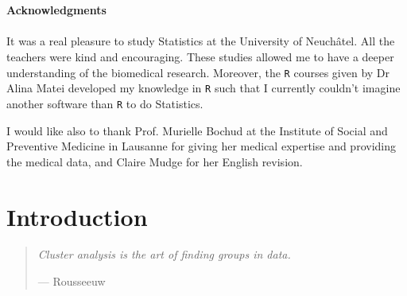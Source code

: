 \documentclass[a4paper]{book}
\author{Denis Deriaz}
\begin{document}





\chapter*{ }

{\LARGE \textbf{Acknowledgments}} \\
\\
It was a real pleasure to study Statistics at the University of Neuchâtel. All the teachers were kind and encouraging. These studies allowed me to have a deeper understanding of the biomedical research. Moreover, the \texttt{R} courses given by Dr Alina Matei developed my knowledge in \texttt{R} such that I currently couldn't imagine another software than \texttt{R} to do Statistics.

I would like also to thank Prof. Murielle Bochud at the Institute of Social and Preventive Medicine in Lausanne for giving her medical expertise and providing the medical data, and Claire Mudge for her English revision.




\tableofcontents


\cleardoublepage{}
\chapter{Introduction}

\begin{quote}
\vspace{1cm}
\begin{flushright} \emph{Cluster analysis is the art of finding groups in data.} \end{flushright}
\begin{flushright} --- Rousseeuw \end{flushright}
\end{quote}
\vspace{1cm}

\end{document}
